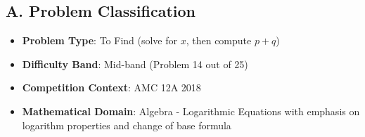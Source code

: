 \documentclass[12pt]{article}
\begin{document}
\begin{problemconfigbox}
\subsection*{A. Problem Classification}
\begin{itemize}[leftmargin=*]
    \item \textbf{Problem Type}: To Find (solve for $x$, then compute $p+q$)
    \item \textbf{Difficulty Band}: Mid-band (Problem 14 out of 25)
    \item \textbf{Competition Context}: AMC 12A 2018
    \item \textbf{Mathematical Domain}: Algebra - Logarithmic Equations with emphasis on logarithm properties and change of base formula
\end{itemize}


\end{problemconfigbox}
\end{document}
